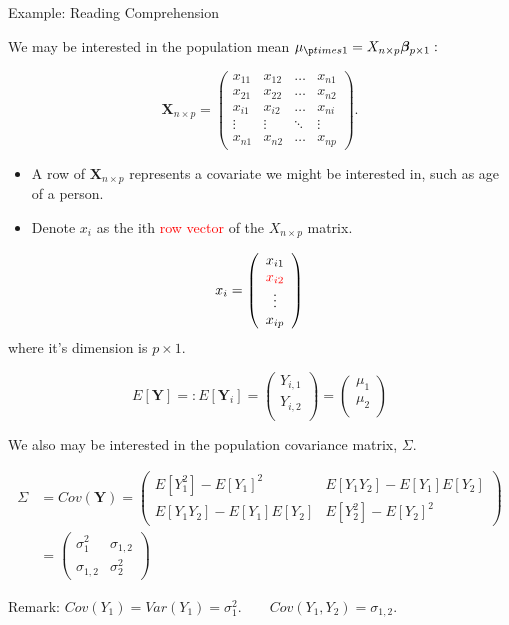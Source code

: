 \documentclass[ignorenonframetext,]{beamer}
\begin{document}
\begin{frame}{Example: Reading Comprehension}

We may be interested in the population mean
\({\mu}_{\p times 1} = X_{n \times p} \bm{\beta}_{p \times 1}:\)

\[\bm{X}_{n \times p} = 
\left( \begin{array}{cccc}
x_{11} & x_{12} & \ldots&  x_{n1}\\
x_{21} & x_{22} & \ldots& x_{n2} \\
x_{i1} & x_{i2} & \ldots& x_{ni} \\
\vdots & \vdots & \ddots & \vdots \\
x_{n1} & x_{n2} &\ldots& x_{np}
\end{array} \right).
\]

\begin{itemize}
\item
  A row of \(\bm{X}_{n \times p}\) represents a covariate we might be
  interested in, such as age of a person.
\item
  Denote \(x_i\) as the ith \textcolor{red}{row vector} of the
  \(X_{n \times p}\) matrix.
\end{itemize}

\[  x_{i}= \left( \begin{array}{c}
x_{i1}\\
\textcolor{red}{x_{i2}}\\
\vdots\\
x_{ip}
\end{array} \right) \] where it's dimension is \(p \times 1.\)

\[
E[\bm{Y}] =: E[\bm{Y}_{i}] = \left( \begin{array}{c}
Y_{i,1}\\
Y_{i,2}\\
\end{array} \right) 
=  \left( \begin{array}{c}
\mu_1\\
\mu_2\\
\end{array} \right) 
\]

We also may be interested in the population covariance matrix,
\(\Sigma.\)

\begin{align}
\Sigma &= Cov(\bm{Y})
=
\left( \begin{array}{cccc}
E[Y_1^2] - E[Y_1]^2 & E[Y_1Y_2] - E[Y_1]E[Y_2] \\
E[Y_1Y_2] - E[Y_1]E[Y_2] & E[Y_2^2] - E[Y_2]^2
\end{array} \right)\\
&=
\left( \begin{array}{cccc}
\sigma_1^2 & \sigma_{1,2} \\
\sigma_{1,2} & \sigma_2^2
\end{array} \right)
\end{align}

Remark:
\(Cov(Y_1) = Var(Y_1) = \sigma_1^2. \qquad Cov(Y_1, Y_2) = \sigma_{1,2}.\)

\end{frame}
\end{document}
